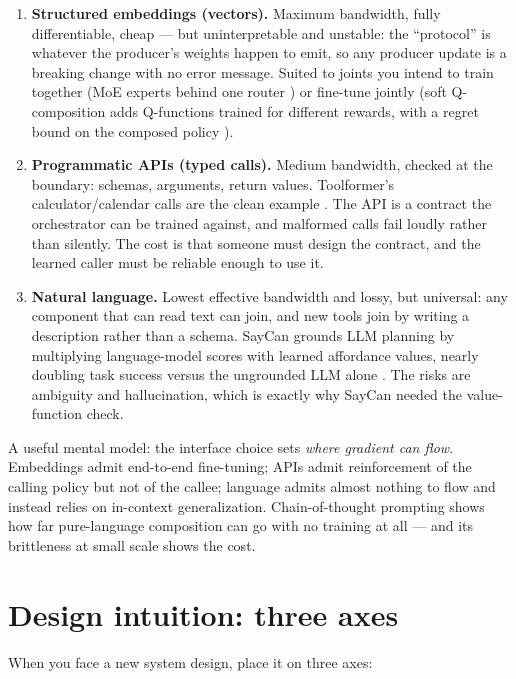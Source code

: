 \documentclass[11pt]{article}
\begin{document}
\begin{enumerate}[noitemsep]
  \item \textbf{Structured embeddings (vectors).} Maximum bandwidth, fully differentiable, cheap --- but uninterpretable and unstable: the ``protocol'' is whatever the producer's weights happen to emit, so any producer update is a breaking change with no error message. Suited to joints you intend to train together (MoE experts behind one router \cite{shazeer2017sparsely}) or fine-tune jointly (soft Q-composition adds Q-functions trained for different rewards, with a regret bound on the composed policy \cite{haarnoja2018composable}).
  \item \textbf{Programmatic APIs (typed calls).} Medium bandwidth, checked at the boundary: schemas, arguments, return values. Toolformer's calculator/calendar calls are the clean example \cite{schick2023toolformer}. The API is a contract the orchestrator can be trained against, and malformed calls fail loudly rather than silently. The cost is that someone must design the contract, and the learned caller must be reliable enough to use it.
  \item \textbf{Natural language.} Lowest effective bandwidth and lossy, but universal: any component that can read text can join, and new tools join by writing a description rather than a schema. SayCan grounds LLM planning by multiplying language-model scores with learned affordance values, nearly doubling task success versus the ungrounded LLM alone \cite{ahn2022saycan}. The risks are ambiguity and hallucination, which is exactly why SayCan needed the value-function check.
\end{enumerate}

A useful mental model: the interface choice sets \emph{where gradient can flow}. Embeddings admit end-to-end fine-tuning; APIs admit reinforcement of the calling policy but not of the callee; language admits almost nothing to flow and instead relies on in-context generalization. Chain-of-thought prompting shows how far pure-language composition can go with no training at all \cite{wei2022chain} --- and its brittleness at small scale shows the cost.

\section{Design intuition: three axes}
When you face a new system design, place it on three axes:
\end{document}
